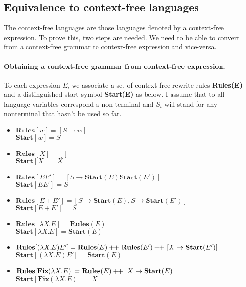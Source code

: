 \subsection{Equivalence to context-free languages}

The context-free languages are those languages denoted by a context-free expression. To prove this, two steps are needed. We need to be able to convert from a context-free grammar to context-free expression and vice-versa.

\paragraph*{Obtaining a context-free grammar from context-free expression.} To each expression $E$, we associate a set of context-free rewrite rules \textbf{Rules(E)} and a distinguished start symbol \textbf{Start(E)} as below. I assume that to all language variables correspond a non-terminal and $S_i$ will stand for any nonterminal that hasn't be used so far.

\begin{itemize}
\item 
$\mathbf{Rules}[w] = [S\rightarrow w]$\\
$\mathbf{Start}[w] = S$
\item 
$\mathbf{Rules}[X] = []$\\
$\mathbf{Start}[X] = X$
\item 
$\mathbf{Rules}[EE'] = [S \rightarrow \mathbf{Start}(E)\mathbf{Start}(E')]$\\
$\mathbf{Start}[EE'] = S$
\item 
$\mathbf{Rules}[E + E'] = [S \rightarrow \mathbf{Start}(E), S\rightarrow\mathbf{Start}(E')]$\\
$\mathbf{Start}[E + E'] = S$
\item 
$\mathbf{Rules}[\lambda X. E] = \mathbf{Rules}(E)$\\
$\mathbf{Start}[\lambda X. E] = \mathbf{Start}(E)$
\item 
$\mathbf{Rules}[(\lambda X. E)E'] = \mathbf{Rules}(E) +\hspace{-3pt}+\ \mathbf{Rules}(E') +\hspace{-3pt}+\ [X\rightarrow \textbf{Start}(E')]$\\
$\mathbf{Start}[(\lambda X. E)E'] = \mathbf{Start}(E)$
\item 
$\mathbf{Rules}[\mathbf{Fix}(\lambda X. E)] = \mathbf{Rules}(E) +\hspace{-3pt}+\ [X\rightarrow \textbf{Start}(E)]$\\
$\mathbf{Start}[\mathbf{Fix}(\lambda X. E)] = X$
\end{itemize}

